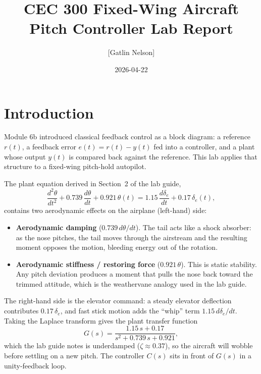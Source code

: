 \documentclass[11pt,letterpaper]{article}
\title{CEC 300 Fixed-Wing Aircraft Pitch Controller Lab Report}
\author{[Gatlin Nelson]}
\date{2026-04-22}
\begin{document}
\maketitle

\section{Introduction}

Module 6b introduced classical feedback control as a block diagram: a
reference $r(t)$, a feedback error $e(t)=r(t)-y(t)$ fed into a controller,
and a plant whose output $y(t)$ is compared back against the reference. This
lab applies that structure to a fixed-wing pitch-hold autopilot.

The plant equation derived in Section~2 of the lab guide,
\begin{equation*}
  \frac{d^{2}\theta}{dt^{2}}
  + 0.739\,\frac{d\theta}{dt}
  + 0.921\,\theta(t)
  = 1.15\,\frac{d\delta_{e}}{dt} + 0.17\,\delta_{e}(t),
\end{equation*}
contains two aerodynamic effects on the airplane (left-hand) side:

\begin{itemize}
  \item \textbf{Aerodynamic damping} ($0.739\,d\theta/dt$). The tail acts
  like a shock absorber: as the nose pitches, the tail moves through the
  airstream and the resulting moment opposes the motion, bleeding energy out
  of the rotation.
  \item \textbf{Aerodynamic stiffness / restoring force}
  ($0.921\,\theta$). This is static stability. Any pitch deviation produces
  a moment that pulls the nose back toward the trimmed attitude, which is
  the weathervane analogy used in the lab guide.
\end{itemize}

The right-hand side is the elevator command: a steady elevator deflection
contributes $0.17\,\delta_{e}$, and fast stick motion adds the ``whip'' term
$1.15\,d\delta_{e}/dt$. Taking the Laplace transform gives the plant
transfer function
\begin{equation*}
  G(s) = \frac{1.15\,s + 0.17}{s^{2} + 0.739\,s + 0.921},
\end{equation*}
which the lab guide notes is underdamped ($\zeta \approx 0.37$), so the
aircraft will wobble before settling on a new pitch. The controller $C(s)$
sits in front of $G(s)$ in a unity-feedback loop.
\end{document}
